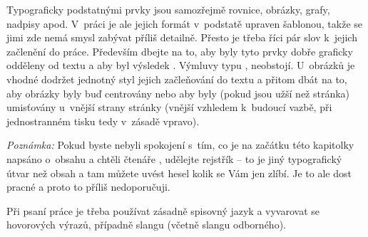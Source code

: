 Typograficky podstatnými prvky jsou samozřejmě rovnice, obrázky, grafy, nadpisy apod. V~práci je ale jejich formát v~podstatě  upraven šablonou, takže se jimi zde nemá smysl zabývat příliš detailně. Přesto je třeba říci pár slov k~jejich začlenění do práce. Především dbejte na to, aby byly 
tyto  prvky dobře graficky odděleny od textu a aby byl výsledek . Výmluvy typu ,  neobstojí. U~obrázků je vhodné dodržet jednotný styl jejich začleňování do textu a přitom dbát na to, aby obrázky byly buď centrovány nebo aby byly (pokud jsou užší než stránka) umisťovány u~vnější strany stránky (vnější vzhledem k~budoucí vazbě, při jednostranném tisku tedy v~zásadě vpravo). 

\textit{Poznámka:} Pokud byste nebyli spokojení s~tím, co je na začátku této kapitolky napsáno o~obsahu a chtěli čtenáře , udělejte rejstřík -- to je jiný typografický útvar než obsah a tam můžete uvést hesel kolik se Vám jen zlíbí. Je to ale dost pracné a proto to příliš nedoporučuji. 
\rm

Při psaní práce je třeba používat zásadně spisovný jazyk a vyvarovat se hovorových výrazů, případně slangu (včetně slangu odborného). 


